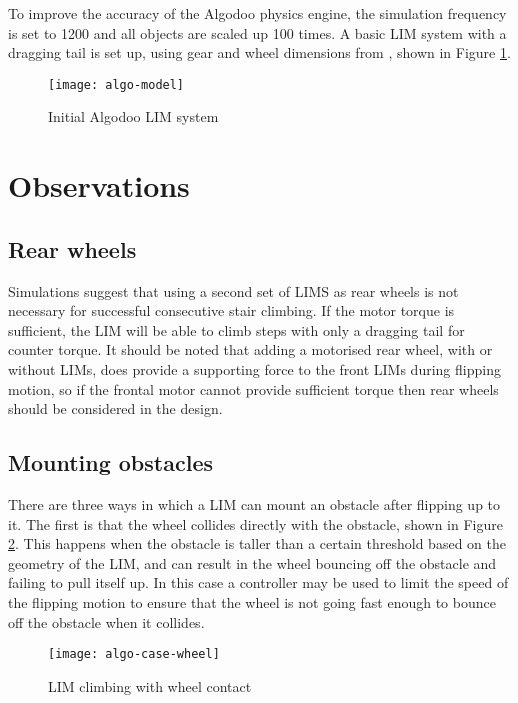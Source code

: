 To improve the accuracy of the Algodoo physics engine, the simulation frequency is set to 1200 and all objects are scaled up 100 times. A basic LIM system with a dragging tail is set up, using gear and wheel dimensions from \cite{Powrie-2019}, shown in Figure \ref{algo-model}.

\begin{figure}[h]
	\centering
	\texttt{[image: algo-model]}
	\caption{Initial Algodoo LIM system}
	\label{algo-model}
\end{figure}
\section{Observations}

\subsection{Rear wheels}

Simulations suggest that using a second set of LIMS as rear wheels is not necessary for successful consecutive stair climbing. If the motor torque is sufficient, the LIM will be able to climb steps with only a dragging tail for counter torque. It should be noted that adding a motorised rear wheel, with or without LIMs, does provide a supporting force to the front LIMs during flipping motion, so if the frontal motor cannot provide sufficient torque then rear wheels should be considered in the design.

\subsection{Mounting obstacles}

There are three ways in which a LIM can mount an obstacle after flipping up to it. The first is that the wheel collides directly with the obstacle, shown in Figure \ref{algo-case-wheel}. This happens when the obstacle is taller than a certain threshold based on the geometry of the LIM, and can result in the wheel bouncing off the obstacle and failing to pull itself up. In this case a controller may be used to limit the speed of the flipping motion to ensure that the wheel is not going fast enough to bounce off the obstacle when it collides. \\

\begin{figure}[h]
	\centering
	\texttt{[image: algo-case-wheel]}
	\caption{LIM climbing with wheel contact}
	\label{algo-case-wheel}
\end{figure}

